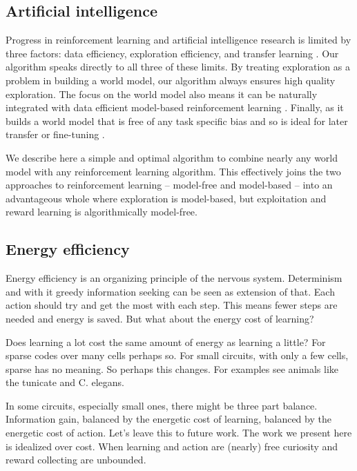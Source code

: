 \documentclass[9pt,lineno]{elife}
\begin{document}
\subsection*{Artificial intelligence}
Progress in reinforcement learning and artificial intelligence research is limited by three factors: data efficiency, exploration efficiency, and transfer learning \citep{Ha2018}. Our algorithm speaks directly to all three of these limits. By treating exploration as a problem in building a world model, our algorithm always ensures high quality exploration. The focus on the world model also means it can be naturally integrated with data efficient model-based reinforcement learning \citep{Sutton2018,Shyam2018}. Finally, as it builds a world model that is free of any task specific bias and so is ideal for later transfer or fine-tuning \citep{Yosinski2014,Barreto2018}. 

We describe here a simple and optimal algorithm to combine nearly any world model with any reinforcement learning algorithm. This effectively joins the two approaches to reinforcement learning -- model-free and model-based -- into an advantageous whole where exploration is model-based, but exploitation and reward learning is algorithmically model-free.


\subsection*{Energy efficiency}
Energy efficiency is an organizing principle of the nervous system. Determinism and with it greedy information seeking can be seen as extension of that. Each action should try and get the most with each step. This means fewer steps are needed and energy is saved. But what about the energy cost of learning?

Does learning a lot cost the same amount of energy as learning a little? For sparse codes over many cells perhaps so. For small circuits, with only a few cells, sparse has no meaning. So perhaps this changes. For examples see animals like the tunicate and C. elegans.

In some circuits, especially small ones, there might be three part balance. Information gain, balanced by the energetic cost of learning, balanced by the energetic cost of action. Let's leave this to future work. The work we present here is idealized over cost. When learning and action are (nearly) free curiosity and reward collecting are unbounded.
\end{document}
